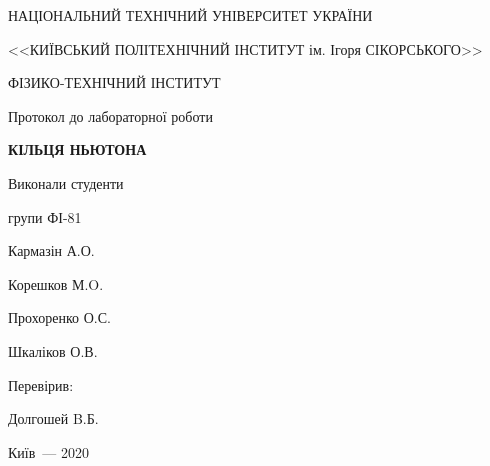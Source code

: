 \thispagestyle{empty}

\begin{center}
НАЦІОНАЛЬНИЙ ТЕХНІЧНИЙ УНІВЕРСИТЕТ УКРАЇНИ \par
<<КИЇВСЬКИЙ ПОЛІТЕХНІЧНИЙ ІНСТИТУТ ім. Ігоря СІКОРСЬКОГО>>\par
ФІЗИКО-ТЕХНІЧНИЙ ІНСТИТУТ\par

\vspace{5cm}
{\huge Протокол до лабораторної роботи\par}

\huge\MakeUppercase{\textbf{ Кільця Ньютона }} \par
\end{center}

\vspace{3cm}
\begin{flushright}
Виконали студенти 

групи ФІ-81

\bigbreak

Кармазін А.О.

Корешков М.O.

Прохоренко О.С.

Шкаліков О.В.

\vspace{20mm}
Перевірив:

Долгошей B.Б.

\end{flushright}

\vspace{6cm}
\begin{center}
{Київ~--- 2020}
\end{center}

\newpage
